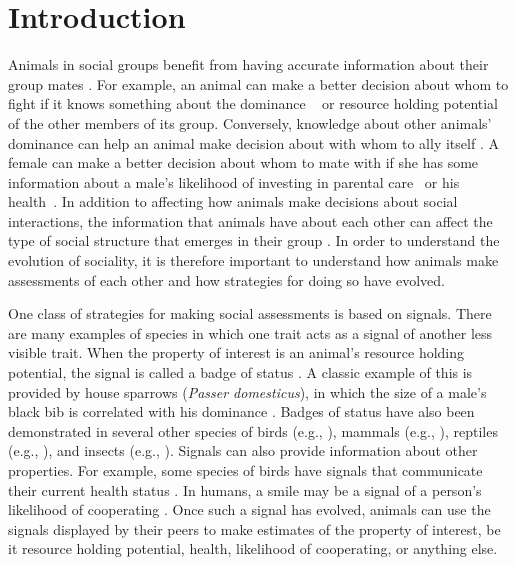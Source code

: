 \section*{Introduction} 
Animals in social groups benefit from having accurate information about their group mates \citep{Seyfarth:2010bh}. For example, an animal can make a better decision about whom to fight if it knows something about the dominance ~\citep{Waal:1986ys,Cowlishaw:1990vn,Bergman:2003qf,Seyfarth:2005ve,Flack:2006uq,Hobson:2015uq} or resource holding potential~\citep{Rhijn:1980uq,Freeman:1985kl,Dick:1990cr,Lemel:1993ve,Part:1997ys} of the other members of its group. Conversely, knowledge about other animals' dominance can help an animal make decision about with whom to ally itself \citep{Engh:2005qp}. A female can  make a better decision about whom to mate with if she has some information about a male's likelihood of investing in parental care~\citep{Qvarnstrom:1997fk,McGlothlin:2007au,Olsen:2010uq} or his health~\citep{Folstad:1992kx,Loyau:2005nx}. In addition to affecting how animals make decisions about social interactions, the information that animals have about each other can affect the type of social structure that emerges in their group \citep{Dugatkin:2004hz,Hobson:2015uq,Brush:2018ss}. In order to understand the evolution of sociality, it is therefore important to understand how animals make assessments of each other and how strategies for doing so have evolved.  

One class of strategies for making social assessments is based on signals. There are many examples of species in which one trait acts as a signal of another less visible trait. When the property of interest is an animal's resource holding potential, the signal is called a badge of status \citep{dawkins1978signals,Rohwer:1981vn,Rohwer:1982fk,Ripoll:2004vn,sheehan2016evotradeoff}. A classic example of this is provided by house sparrows (\emph{Passer domesticus}), in which the size of a male's black bib is correlated with his dominance \citep{Veiga:1993fk,Veiga:1995ys}. Badges of status have also been demonstrated in several other species of birds (e.g., \citep{Remy:2010fk,Olsen:2010uq,Lemel:1993ve,Tibbetts:2009kx}), mammals (e.g., \citep{Gerald:2001zm}), reptiles (e.g., \citep{Fox:1990hd}), and insects (e.g., \citep{Tibbetts:2004kx}). Signals can also provide information about other properties. For example, some species of birds have signals that communicate their current health status \citep{Folstad:1992kx,Loyau:2005nx}. In humans, a smile may be a signal of a person's likelihood of cooperating \citep{Schug:2010be}. Once such a signal has evolved, animals can use the signals displayed by their peers to make estimates of the property of interest, be it resource holding potential, health, likelihood of cooperating, or anything else.

